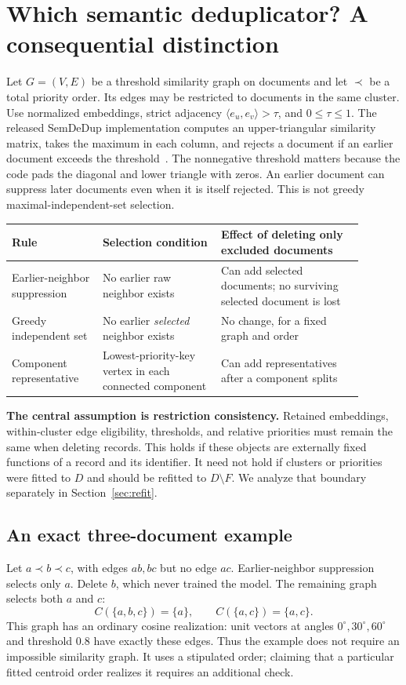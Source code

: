 \documentclass[11pt,a4paper]{article}
\theoremstyle{definition}\newtheorem{definition}[theorem]{Definition}
\newcommand{\minus}{\setminus}
\begin{document}
\section{Which semantic deduplicator? A consequential distinction}
Let $G=(V,E)$ be a threshold similarity graph on documents and let $\prec$ be a total priority order. Its edges may be restricted to documents in the same cluster. Use normalized embeddings, strict adjacency $\langle e_u,e_v\rangle>\tau$, and $0\le\tau\le1$. The released SemDeDup implementation computes an upper-triangular similarity matrix, takes the maximum in each column, and rejects a document if an earlier document exceeds the threshold~\cite{semdedup,semcode}. The nonnegative threshold matters because the code pads the diagonal and lower triangle with zeros. An earlier document can suppress later documents even when it is itself rejected. This is not greedy maximal-independent-set selection.

\begin{center}\small
\begin{tabular}{p{0.23\linewidth}p{0.30\linewidth}p{0.36\linewidth}}
\toprule
Rule & Selection condition & Effect of deleting only excluded documents\\
\midrule
Earlier-neighbor suppression & No earlier raw neighbor exists & Can add selected documents; no surviving selected document is lost\\
Greedy independent set & No earlier \emph{selected} neighbor exists & No change, for a fixed graph and order\\
Component representative & Lowest-priority-key vertex in each connected component & Can add representatives after a component splits\\
\bottomrule
\end{tabular}
\end{center}

\textbf{The central assumption is restriction consistency.} Retained embeddings, within-cluster edge eligibility, thresholds, and relative priorities must remain the same when deleting records. This holds if these objects are externally fixed functions of a record and its identifier. It need not hold if clusters or priorities were fitted to $D$ and should be refitted to $D\minus F$. We analyze that boundary separately in Section~\ref{sec:refit}.

\subsection{An exact three-document example}
Let $a\prec b\prec c$, with edges $ab,bc$ but no edge $ac$. Earlier-neighbor suppression selects only $a$. Delete $b$, which never trained the model. The remaining graph selects both $a$ and $c$:
\[
 C(\{a,b,c\})=\{a\},\qquad C(\{a,c\})=\{a,c\}.
\]
This graph has an ordinary cosine realization: unit vectors at angles $0^\circ,30^\circ,60^\circ$ and threshold $0.8$ have exactly these edges. Thus the example does not require an impossible similarity graph. It uses a stipulated order; claiming that a particular fitted centroid order realizes it requires an additional check.
\end{document}
